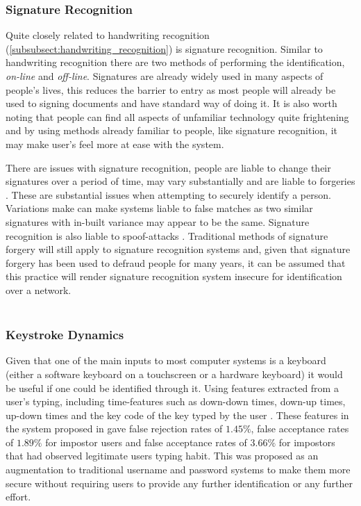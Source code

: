 \documentclass[12pt]{article}
\begin{document}
	\subsubsection{Signature Recognition}
	\label{subsubsect:signature_recognition}
	Quite closely related to handwriting recognition (\ref{subsubsect:handwriting_recognition}) is signature recognition. Similar to handwriting recognition there are two methods of performing the identification, \emph{on-line} and \emph{off-line}. Signatures are already widely used in many aspects of people's lives, this reduces the barrier to entry as most people will already be used to signing documents and have standard way of doing it. It is also worth noting that people can find all aspects of unfamiliar technology quite frightening and by using methods already familiar to people, like signature recognition, it may make user's feel more at ease with the system.
	
	There are issues with signature recognition, people are liable to change their signatures over a period of time, may vary substantially and are liable to forgeries \citep{jain2004introduction}. These are substantial issues when attempting to securely identify a person. Variations make can make systems liable to false matches as two similar signatures with in-built variance may appear to be the same. Signature recognition is also liable to spoof-attacks \citep{jain2004introduction}. Traditional methods of signature forgery will still apply to signature recognition systems and, given that signature forgery has been used to defraud people for many years, it can be assumed that this practice will render signature recognition system insecure for identification over a network.
	\\
	\\
	\subsubsection{Keystroke Dynamics}
	\label{subsubsect:keystroke_dynamics}
	Given that one of the main inputs to most computer systems is a keyboard (either a software keyboard on a touchscreen or a hardware keyboard) it would be useful if one could be identified through it. Using features extracted from a user's typing, including time-features such as down-down times, down-up times, up-down times and the key code of the key typed by the user \citep{typing_auth2005}. These features in the system proposed in \cite{typing_auth2005} gave false rejection rates of $1.45\%$, false acceptance rates of $1.89\%$ for impostor users and false acceptance rates of $3.66\%$ for impostors that had observed legitimate users typing habit. This was proposed as an augmentation to traditional username and password systems to make them more secure without requiring users to provide any further identification or any further effort.
	
\end{document}

